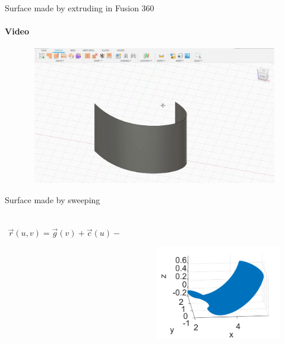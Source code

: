 \documentclass[aspectratio=169]{beamer}
\begin{document}
\begin{frame}[t]{Surface made by extruding in Fusion 360}
    \framesubtitle{Video}
    \vspace{-0.6cm}
    \begin{figure}[H]
        \href{run:./videos/extruding_surface_video.mp4}{
            \centering\includegraphics[height=6cm,width=1\textwidth,keepaspectratio]{extruding_surface_video_preview.jpg}}
    \end{figure}
\end{frame}

\begin{frame}[t]{Surface made by sweeping}
\framesubtitle{}
    \begin{columns}[T,onlytextwidth]
        \begin{column}{0.49\textwidth}
            \begin{align*}
                \vec{r}(u,v) = \vec{g}(v) + \vec{c}(u) - \vec{g}(v_{min})
            \end{align*}
        \end{column}
        \begin{column}{0.49\textwidth}
            \begin{figure}[H]
                \centering\includegraphics[height=6cm,width=1\textwidth,keepaspectratio]{sweeping_surface.png}
                \label{fig:sweeping_surface.png}
            \end{figure}
        \end{column}
    \end{columns}
\end{frame}
\end{document}
